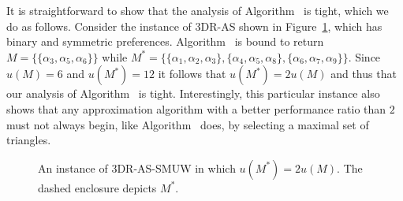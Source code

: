It is straightforward to show that the analysis of Algorithm~ is tight, which we do as follows. Consider the instance of 3DR-AS shown in Figure~\ref{fig:threed_sr_as_max_welfare_example}, which has binary and symmetric preferences. Algorithm~ is bound to return $M=\{ \{ \alpha_3, \alpha_5, \alpha_6 \} \}$ while $M^*=\{\{ \alpha_1, \alpha_2, \alpha_3 \},\allowbreak \{ \alpha_4, \alpha_5, \alpha_8 \}, \{ \alpha_6, \alpha_7, \alpha_9 \}\}$. Since $u(M)=6$ and $u(M^*)=12$ it follows that $u(M^*)=2u(M)$ and thus that our analysis of Algorithm~ is tight. Interestingly, this particular instance also shows that any approximation algorithm with a better performance ratio than $2$ must not always begin, like Algorithm~ does, by selecting a maximal set of triangles.
\begin{figure}
    \centering
    
    \vspace*{1mm}
    \caption[An instance of 3DR-AS-SMUW in which $u(M^*)=2u(M)$]{An instance of 3DR-AS-SMUW in which $u(M^*)=2u(M)$. The dashed enclosure depicts $M^*$.}
    \label{fig:threed_sr_as_max_welfare_example}
\end{figure}